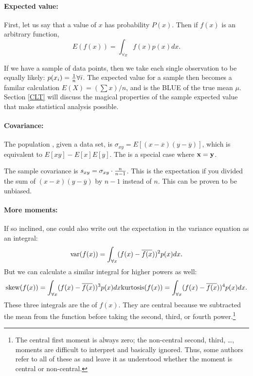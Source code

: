 \paragraph{Expected value:} 
First, let us say that a value of $x$ has probability $P(x)$. Then
if $f(x)$ is an arbitrary function, 
$$E(f(x))=\int_{\forall x} f(x)p(x) dx.$$

If we have a sample of data points, then we take each single observation
to be equally likely: $p(x_i)={1\over n} \forall i$.
The expected value for a sample then becomes a familar calculation
$E(X)=(\sum x)/n$, and is the BLUE of
the true mean $\mu$. Section \ref{CLT} will discuss the magical properties of the
sample expected value that make statistical analysis possible.

\paragraph{Covariance:} The population , given a data set,
is $\sigma_{xy} = E[(x-\overline x)(y-\overline y)]$, which is equivalent
to $E[xy]-E[x]E[y]$. The  is a special case where ${\bf x}={\bf y}$.

The sample covariance is $s_{xy}=\sigma_{xy}\cdot {n\over n-1}$. This
is
the expectation if you  divided the sum of $(x-\overline
x)(y-\overline y)$ by $n-1$ instead of $n$. This
can be proven to be unbiased.

\paragraph{More moments:}   
If so inclined, one could also write out the
expectation in the variance equation as an integral:
$$\hbox{var}(f(x))=\int_{\forall x} (f(x) - \overline{f(x}))^2 p(x) dx.$$
But we can calculate a similar integral for higher powers as well:
$${\rm skew}(f(x))=\int_{\forall x} (f(x) - \overline{f(x}))^3 p(x) dx\\
{\rm kurtosis}(f(x))=\int_{\forall x} (f(x) - \overline{f(x}))^4 p(x) dx.$$
These three integrals are the  of $f(x)$. They
are central because we subtracted the mean from the function before
taking the second, third, or fourth power.\footnote{The
central first moment is always zero; the non-central second, third,
\dots, moments are difficult to interpret and basically ignored. Thus,
some authors refer to all of these as  and leave
it as understood whether the moment is central or non-central.}

